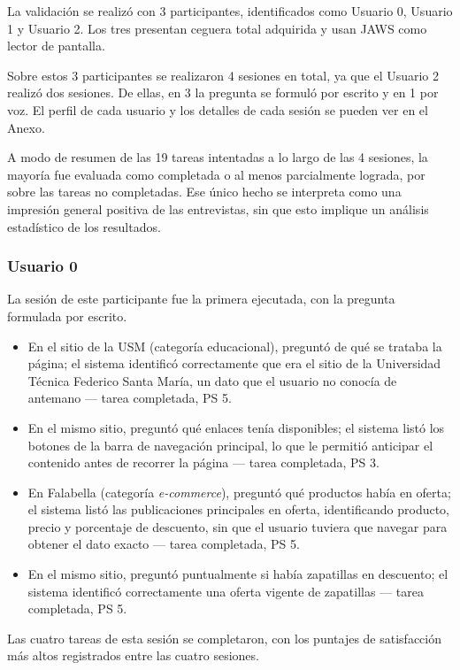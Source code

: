 La validación se realizó con 3 participantes, identificados como Usuario 0, Usuario 1 y Usuario 2. Los tres presentan ceguera total adquirida y usan JAWS como lector de pantalla.

Sobre estos 3 participantes se realizaron 4 sesiones en total, ya que el Usuario 2 realizó dos sesiones. De ellas, en 3 la pregunta se formuló por escrito y en 1 por voz. El perfil de cada usuario y los detalles de cada sesión se pueden ver en el Anexo.

A modo de resumen de las 19 tareas intentadas a lo largo de las 4 sesiones, la mayoría fue evaluada como completada o al menos parcialmente lograda, por sobre las tareas no completadas. Ese único hecho se interpreta como una impresión general positiva de las entrevistas, sin que esto implique un análisis estadístico de los resultados.

\subsubsection{Usuario 0}

La sesión de este participante fue la primera ejecutada, con la pregunta formulada por escrito.

\begin{itemize}
    \item En el sitio de la USM (categoría educacional), preguntó de qué se trataba la página; el sistema identificó correctamente que era el sitio de la Universidad Técnica Federico Santa María, un dato que el usuario no conocía de antemano — tarea completada, PS 5.
    \item En el mismo sitio, preguntó qué enlaces tenía disponibles; el sistema listó los botones de la barra de navegación principal, lo que le permitió anticipar el contenido antes de recorrer la página — tarea completada, PS 3.
    \item En Falabella (categoría \textit{e-commerce}), preguntó qué productos había en oferta; el sistema listó las publicaciones principales en oferta, identificando producto, precio y porcentaje de descuento, sin que el usuario tuviera que navegar para obtener el dato exacto — tarea completada, PS 5.
    \item En el mismo sitio, preguntó puntualmente si había zapatillas en descuento; el sistema identificó correctamente una oferta vigente de zapatillas — tarea completada, PS 5.
\end{itemize}

Las cuatro tareas de esta sesión se completaron, con los puntajes de satisfacción más altos registrados entre las cuatro sesiones.

